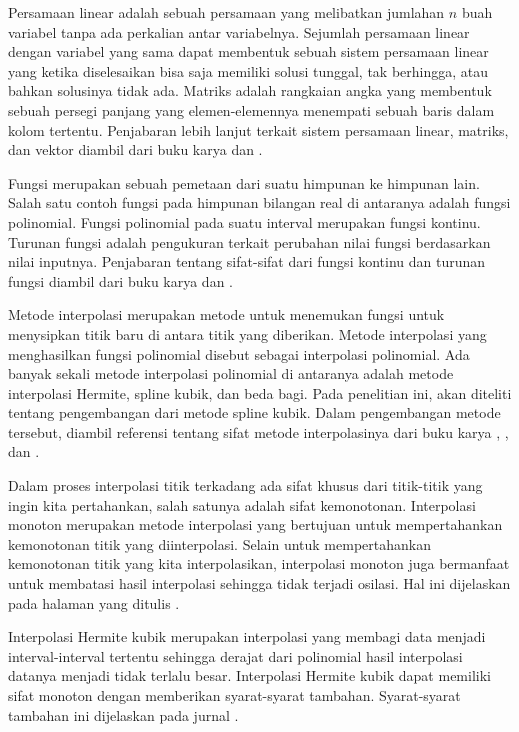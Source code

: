
Persamaan linear adalah sebuah persamaan yang melibatkan jumlahan $n$ buah variabel tanpa ada perkalian antar variabelnya. Sejumlah persamaan linear dengan variabel yang sama dapat membentuk sebuah sistem persamaan linear yang ketika diselesaikan bisa saja memiliki solusi tunggal, tak berhingga, atau bahkan solusinya tidak ada. Matriks adalah rangkaian angka yang membentuk sebuah persegi panjang yang elemen-elemennya menempati sebuah baris dalam kolom tertentu. Penjabaran lebih lanjut terkait sistem persamaan linear, matriks, dan vektor diambil dari buku karya  dan .

Fungsi merupakan sebuah pemetaan dari suatu himpunan ke himpunan lain. Salah satu contoh fungsi pada himpunan bilangan real di antaranya adalah fungsi polinomial. Fungsi polinomial pada suatu interval merupakan fungsi kontinu. Turunan fungsi adalah pengukuran terkait perubahan nilai fungsi berdasarkan nilai inputnya. Penjabaran tentang sifat-sifat dari fungsi kontinu dan turunan fungsi diambil dari buku karya  dan .

Metode interpolasi merupakan metode untuk menemukan fungsi untuk menysipkan titik baru di antara titik yang diberikan. Metode interpolasi yang menghasilkan fungsi polinomial disebut sebagai interpolasi polinomial. Ada banyak sekali metode interpolasi polinomial di antaranya adalah metode interpolasi Hermite, spline kubik, dan beda bagi. Pada penelitian ini, akan diteliti tentang pengembangan dari metode spline kubik. Dalam pengembangan metode tersebut, diambil referensi tentang sifat metode interpolasinya dari buku karya , , dan .

Dalam proses interpolasi titik terkadang ada sifat khusus dari titik-titik yang ingin kita pertahankan, salah satunya adalah sifat kemonotonan. Interpolasi monoton merupakan metode interpolasi yang bertujuan untuk mempertahankan kemonotonan titik yang diinterpolasi. Selain untuk mempertahankan kemonotonan titik yang kita interpolasikan, interpolasi monoton juga bermanfaat untuk membatasi hasil interpolasi sehingga tidak terjadi osilasi. Hal ini dijelaskan pada halaman yang ditulis .

Interpolasi Hermite kubik merupakan interpolasi yang membagi data menjadi interval-interval tertentu sehingga derajat dari polinomial hasil interpolasi datanya menjadi tidak terlalu besar. Interpolasi Hermite kubik dapat memiliki sifat monoton dengan memberikan syarat-syarat tambahan. Syarat-syarat tambahan ini dijelaskan pada jurnal .

